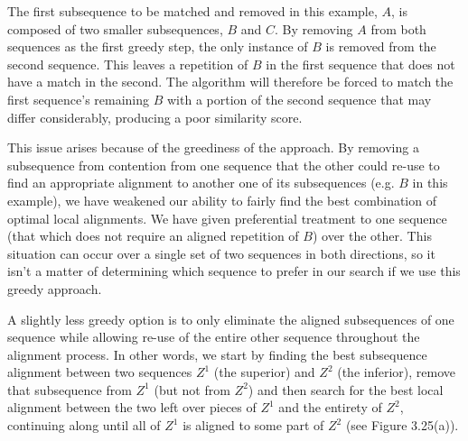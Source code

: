 \documentclass[12pt]{report} 	%
\numberwithin{figure}{chapter}
\numberwithin{table}{chapter}
\numberwithin{equation}{chapter}
\begin{document}
\begin{flushleft}
The first subsequence to be matched and removed in this example, $A$, is composed of two smaller subsequences, $B$ and $C$. By removing $A$ from both sequences as the first greedy step, the only instance of $B$ is removed from the second sequence. This leaves a repetition of $B$ in the first sequence that does not have a match in the second. The algorithm will therefore be forced to match the first sequence's remaining $B$ with a portion of the second sequence that may differ considerably, producing a poor similarity score.

This issue arises because of the greediness of the approach. By removing a subsequence from contention from one sequence that the other could re-use to find an appropriate alignment to another one of its subsequences (e.g. $B$ in this example), we have weakened our ability to fairly find the best combination of optimal local alignments. We have given preferential treatment to one sequence (that which does not require an aligned repetition of $B$) over the other. This situation can occur over a single set of two sequences in both directions, so it isn't a matter of determining which sequence to prefer in our search if we use this greedy approach. 

A slightly less greedy option is to only eliminate the aligned subsequences of one sequence while allowing re-use of the entire other sequence throughout the alignment process. In other words, we start by finding the best subsequence alignment between two sequences $Z^1$ (the superior) and $Z^2$ (the inferior), remove that subsequence from $Z^1$ (but not from $Z^2$) and then search for the best local alignment between the two left over pieces of $Z^1$ and the entirety of $Z^2$, continuing along until all of $Z^1$ is aligned to some part of $Z^2$ (see Figure 3.25(a)).


\end{flushleft}
\end{document}
